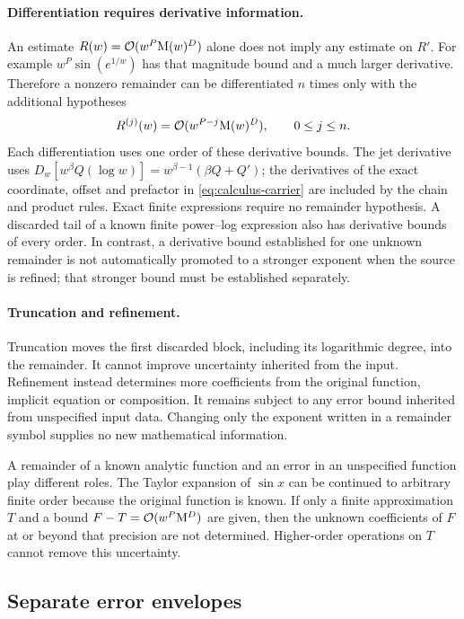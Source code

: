 \paragraph{Differentiation requires derivative information.}
An estimate $R(w)=\mathcal O(w^P\mathrm M(w)^D)$ alone does not imply any estimate on
$R'$. For example $w^P\sin(e^{1/w})$ has that magnitude bound and a much
larger derivative. Therefore a nonzero remainder can be differentiated
$n$ times only with the additional hypotheses
\[
 R^{(j)}(w)=\mathcal O(w^{P-j}\mathrm M(w)^D),\qquad 0\le j\le n.
\]
Each differentiation uses one order of these derivative bounds. The jet derivative uses
$D_w[w^\beta Q(\log w)]=w^{\beta-1}(\beta Q+Q')$; the derivatives
of the exact coordinate, offset and prefactor in
\eqref{eq:calculus-carrier} are included by the chain and product rules.
Exact finite expressions require no remainder hypothesis. A discarded tail
of a known finite power--log expression also has derivative bounds of every
order. In contrast, a derivative bound established for one unknown remainder
is not automatically promoted to a stronger exponent when the source is
refined; that stronger bound must be established separately.

\paragraph{Truncation and refinement.}
Truncation moves the first discarded block, including its logarithmic
degree, into the remainder. It cannot improve uncertainty inherited from
the input. Refinement instead determines more coefficients from the original function,
implicit equation or composition. It remains subject to any error bound
inherited from unspecified input data. Changing only the exponent written
in a remainder symbol supplies no new mathematical information.

A remainder of a known analytic function and an error in an unspecified
function play different roles. The Taylor expansion of $\sin x$ can be
continued to arbitrary finite order because the original function is known.
If only a finite approximation $T$ and a bound $F-T=\mathcal O(w^P\mathrm M^D)$ are given,
then the unknown coefficients of $F$ at or beyond that precision are not
determined. Higher-order operations on $T$ cannot remove this uncertainty.

\subsection{Separate error envelopes}
\label{sec:separate-error-envelopes}

